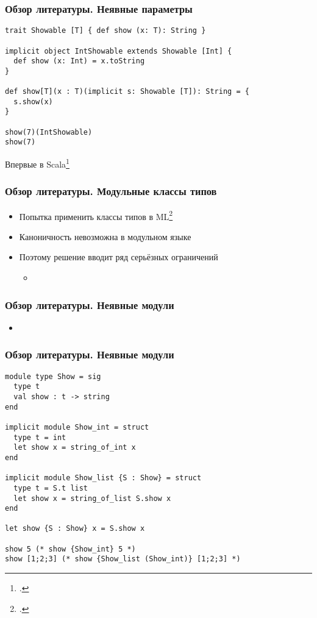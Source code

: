 \documentclass{beamer}
\begin{document}
\lstset{language=scala}
\begin{frame}[fragile]\frametitle{Обзор литературы. Неявные параметры}
\begin{lstlisting}
trait Showable [T] { def show (x: T): String }

implicit object IntShowable extends Showable [Int] {
  def show (x: Int) = x.toString
}

def show[T](x : T)(implicit s: Showable [T]): String = {
  s.show(x)
}

show(7)(IntShowable)
show(7)
\end{lstlisting}
Впервые в Scala\footcite{implicits}
\end{frame}

\begin{frame}\frametitle{Обзор литературы. Модульные классы типов}
\begin{itemize}
  \item Попытка применить классы типов в ML\footcite{ml_typeclasses}
  \item Каноничность невозможна в модульном языке
  \item Поэтому решение вводит ряд серьёзных ограничений
  \begin{itemize}
    \item
  \end{itemize}
\end{itemize}
\end{frame}

\begin{frame}\frametitle{Обзор литературы. Неявные модули}
\begin{itemize}
  \item 
\end{itemize}
\end{frame}

\lstset{language=caml}
\begin{frame}[fragile]\frametitle{Обзор литературы. Неявные модули}
\begin{lstlisting}
module type Show = sig
  type t
  val show : t -> string
end

implicit module Show_int = struct
  type t = int
  let show x = string_of_int x
end

implicit module Show_list {S : Show} = struct
  type t = S.t list
  let show x = string_of_list S.show x
end

let show {S : Show} x = S.show x

show 5 (* show {Show_int} 5 *)
show [1;2;3] (* show {Show_list (Show_int)} [1;2;3] *)
\end{lstlisting}
\end{frame}
\end{document}
